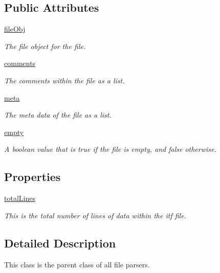 \subsection*{Public Attributes}
\begin{DoxyCompactItemize}
\item 
\hyperlink{class_chassis_8git_1_1file_parser_1_1file_parser_afed07b7aef64bcf14e3f5dfbfb8abdad}{file\-Obj}
\begin{DoxyCompactList}\small\item\em The file object for the file. \end{DoxyCompactList}\item 
\hyperlink{class_chassis_8git_1_1file_parser_1_1file_parser_a0fe55989374700f448b8b931665016b8}{comments}
\begin{DoxyCompactList}\small\item\em The comments within the file as a list. \end{DoxyCompactList}\item 
\hyperlink{class_chassis_8git_1_1file_parser_1_1file_parser_abc3276e824252bca239dd8f225b94724}{meta}
\begin{DoxyCompactList}\small\item\em The meta data of the file as a list. \end{DoxyCompactList}\item 
\hyperlink{class_chassis_8git_1_1file_parser_1_1file_parser_af6c4654848127445265b91e10393b302}{empty}
\begin{DoxyCompactList}\small\item\em A boolean value that is true if the file is empty, and false otherwise. \end{DoxyCompactList}\end{DoxyCompactItemize}
\subsection*{Properties}
\begin{DoxyCompactItemize}
\item 
\hyperlink{class_chassis_8git_1_1file_parser_1_1file_parser_af91767a86e07d0ee859c2548d88c7bc7}{total\-Lines}
\begin{DoxyCompactList}\small\item\em This is the total number of lines of data within the itf file. \end{DoxyCompactList}\end{DoxyCompactItemize}


\subsection{Detailed Description}
This class is the parent class of all file parsers. 



